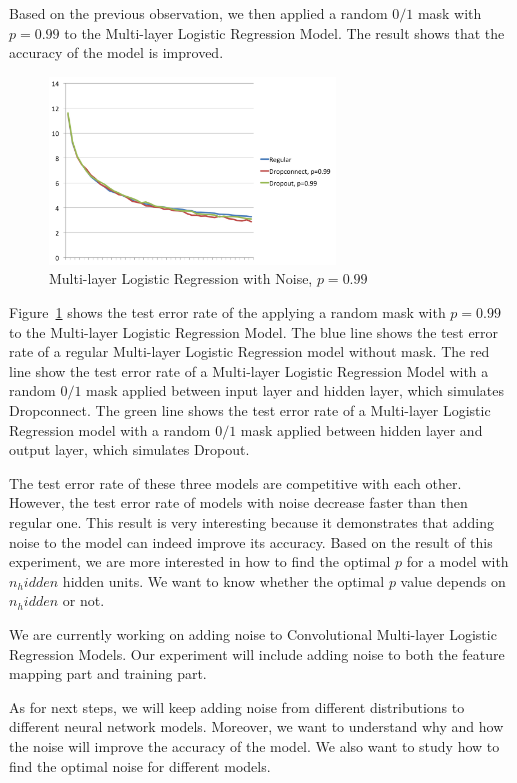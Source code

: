 Based on the previous observation, we then applied a random $0/1$ mask
with $p=0.99$ to the Multi-layer Logistic Regression Model. The result
shows that the accuracy of the model is improved.

\begin{figure}[h]
\centering
\includegraphics[width=215pt]{figs/mlp_pbig.png}
\caption{Multi-layer Logistic Regression with Noise, $p=0.99$}
\label{fig:mlp-noise-pbig}
\end{figure}

Figure~\ref{fig:mlp-noise-pbig} shows the test error rate of the
applying a random mask with $p=0.99$ to the Multi-layer Logistic
Regression Model.
The blue line shows the test error rate of a regular Multi-layer Logistic
Regression model without mask.
The red line show the test error rate of a Multi-layer Logistic Regression
Model with a random $0/1$ mask applied between input layer and hidden
layer, which simulates Dropconnect.
The green line shows the test error rate of a Multi-layer Logistic
Regression model with a random $0/1$ mask applied between hidden layer and
output layer, which simulates Dropout.

The test error rate of these three models are competitive with each other.
However, the test error rate of models with noise decrease faster than
then regular one. This result is very interesting because it demonstrates
that adding noise to the model can indeed improve its accuracy.
Based on the result of this experiment, we are more interested in how to
find the optimal $p$ for a model with $n_hidden$ hidden units. We want to
know whether the optimal $p$ value depends on $n_hidden$ or not.

We are currently working on adding noise to Convolutional Multi-layer
Logistic Regression Models. Our experiment will include adding noise to
both the feature mapping part and training part.

As for next steps, we will keep adding noise from different
distributions to different neural network models.
Moreover, we want to understand why and how the noise will improve the
accuracy of the model. We also want to study how to find the optimal
noise for different models.

